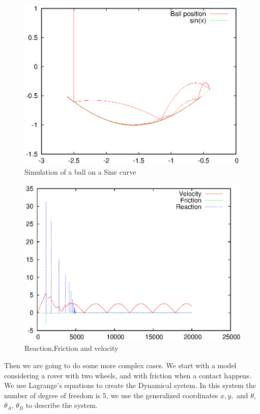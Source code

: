 \begin{figure}[H]
 \begin{center}
      \includegraphics[width=12cm]{ballonsin.eps}
      \caption{Simulation of a ball on a Sine curve}
      \label{ballonsin}
  \end{center}
\end{figure}

\begin{figure}[H]
 \begin{center}
      \includegraphics[width=12cm]{ballonsinRFV.eps}
      \caption{Reaction,Friction and velocity}
      \label{ballonsinRFV}
  \end{center}
\end{figure}





Then we are going to do some more complex cases.
We start with a model considering a rover with two wheels, and with friction when a contact happens.
We use Lagrange's equations to create the Dynamical system.
In this system the number of degree of freedom is 5, we use the generalized coordinates $x,y,$ and $\theta$, $\theta_A$, $\theta_B$ to describe the system.

